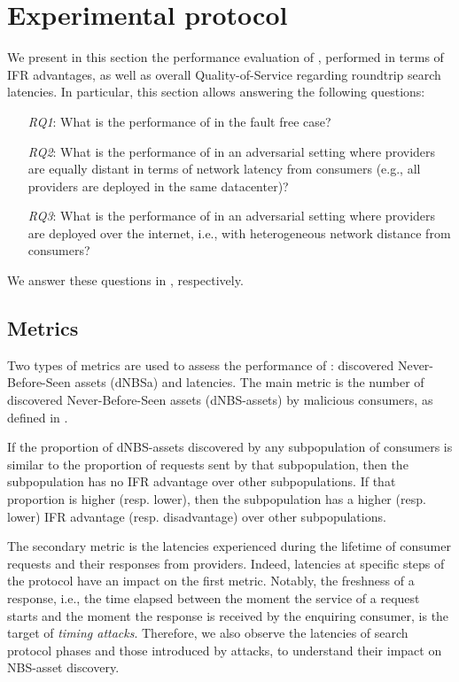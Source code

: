 \section{Experimental protocol}\label{sec:experimental_protocol}

We present in this section the performance evaluation of \sysname, performed in terms of IFR advantages, as well as overall Quality-of-Service regarding roundtrip search latencies.
In particular, this section allows answering the following questions: 
\begin{itemize}
    \item[\emph{RQ1}:] What is the performance of \sysname\space in the fault free case?
    \item[\emph{RQ2}:] What is the performance of \sysname\space in an adversarial setting where providers are equally distant in terms of network latency from consumers (e.g., all providers are deployed in the same datacenter)?
    \item[\emph{RQ3}:] What is the performance of \sysname\space in an adversarial setting where providers are deployed over the internet, i.e., with heterogeneous network distance from consumers?
\end{itemize}
We answer these questions in , respectively.
\subsection{Metrics}

Two types of metrics are used to assess the performance of \sysname: discovered Never-Before-Seen assets (dNBSa) and latencies.
The main metric is the number of discovered Never-Before-Seen assets (dNBS-assets) by malicious consumers, as defined in .

If the proportion of dNBS-assets discovered by any subpopulation of consumers is similar to the proportion of requests sent by that subpopulation, then the subpopulation has no IFR advantage over other subpopulations.
If that proportion is higher (resp. lower), then the subpopulation has a higher (resp. lower) IFR advantage (resp. disadvantage) over other subpopulations.

The secondary metric is the latencies experienced during the lifetime of consumer requests and their responses from providers. Indeed, latencies at specific steps of the protocol have an impact on the first metric.
Notably, the freshness of a response, i.e., the time elapsed between the moment the service of a request starts and the moment the response is received by the enquiring consumer, is the target of \emph{timing attacks}.
Therefore, we also observe the latencies of search protocol phases and those introduced by attacks, to understand their impact on NBS-asset discovery.

